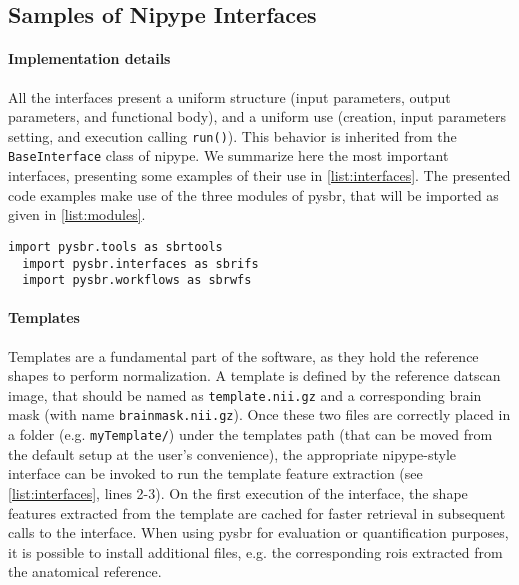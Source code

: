 \documentclass{frontiers}
\newcommand{\fixme}[1]{}
\newcommand{\fixme}[1]{{\color{red}{\bf FIXME: }\emph{#1}}}
\begin{document}
\subsection*{Samples of Nipype Interfaces}
\cbstart
\fixme{this area with the gray bar should be re-written. It has been taken from the body}
\paragraph{Implementation details}
\label{sec:implementation_details}

All the interfaces present a uniform structure (input parameters, output parameters,
  and functional body), and a uniform use (creation, input parameters setting, and
  execution calling \texttt{run()}).
This behavior is inherited from the \texttt{BaseInterface} class of \gls*{nipype}.
We summarize here the most important interfaces,
  presenting some examples of their use in \autoref{list:interfaces}.
The presented code examples make use of the three modules of 
  \gls*{pysbr}, that will be imported as given in \autoref{list:modules}.
  
  \begin{lstlisting}[float,numbers=none,caption={\label{list:modules}
            Loading the three major elements of the python interface of PySBR}]
  import pysbr.tools as sbrtools
  import pysbr.interfaces as sbrifs
  import pysbr.workflows as sbrwfs
  \end{lstlisting}

\paragraph{Templates}
\label{sec:templates}
Templates are a fundamental part of the software, as they hold the reference shapes to
  perform normalization.
A template is defined by the reference \gls*{datscan} image, that
  should be named as \texttt{template.nii.gz} and a corresponding brain mask (with name
  \texttt{brainmask.nii.gz}).
Once these two files are correctly placed in a folder
  (e.g. \texttt{myTemplate/}) under the templates path (that can be moved from the
  default setup at the user's convenience), the appropriate \gls*{nipype}-style
  interface can be invoked to run the template feature extraction (see
  \autoref{list:interfaces}, lines 2-3).
On the first execution of the interface, the shape features extracted from
  the template are cached for faster retrieval in subsequent calls to the interface. 
When using \gls*{pysbr} for evaluation or quantification purposes, it is possible
  to install additional files, e.g. the corresponding \glspl*{roi} extracted
  from the anatomical reference.
\end{document}
